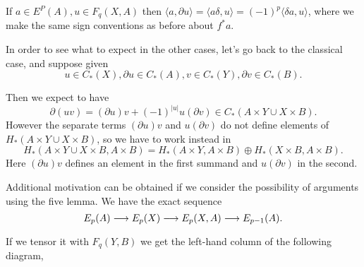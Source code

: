 \documentclass[../main]{subfiles}
\begin{document}
\par If $a \in E^P(A), u \in F_q(X,A)$ then $\langle a, \partial u \rangle = \langle a\delta,u\rangle=(-1)^p\langle\delta a,u\rangle$, where we make the same sign conventions as before about $f^\ast a$.

\par In order to see what to expect in the other cases, let's go back to the classical case, and suppose given \[u \in C_\ast(X), \partial u \in C_\ast(A), v\in C_\ast(Y), \partial v \in C_\ast(B).\]

Then we expect to have \[\partial (uv) = (\partial u)v + (-1)^{|u|}u(\partial v) \in C_\ast (A \times Y \cup X \times B).\] However the separate terms $(\partial u)v$ and $u(\partial v)$ do not define elements of $H_\ast(A \times Y \cup X \times B)$, so we have to work instead in \[H_\ast(A \times Y \cup X \times B, A \times B) = H_\ast(A \times Y, A \times B) \oplus H_\ast(X\times B, A\times B).\] Here $(\partial u)v$ defines an element in the first summand and $u(\partial v)$ in the second.

\par Additional motivation can be obtained if we consider the possibility of arguments using the five lemma. We have the exact sequence \[E_p(A) \lar{} E_p(X) \lar{} E_p(X,A) \lar{} E_{p-1}(A).\]  If we tensor it with $F_q(Y,B)$ we get the left-hand column of the following diagram,
\end{document}
